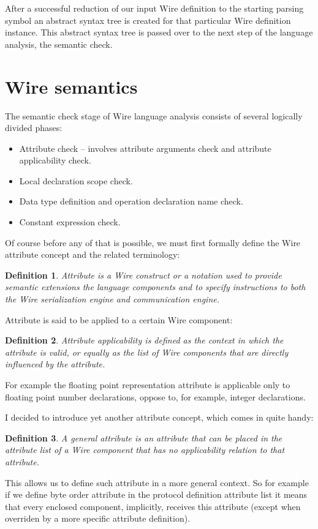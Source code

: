 \documentclass[times, utf8, diplomski]{fer}
\newtheorem{wiredef}{Definition}
\begin{document}
After a successful reduction of our input Wire definition to the starting parsing 
symbol an abstract syntax tree is created for that particular Wire definition 
instance. This abstract syntax tree is passed over to the next step of the 
language analysis, the semantic check.

\section{Wire semantics}
The semantic check stage of Wire language analysis consists of several logically divided phases:
\begin{itemize}
	\item Attribute check – involves attribute arguments check and attribute applicability check.
	\item Local declaration scope check.
	\item Data type definition and operation declaration name check.
	\item Constant expression check.
\end{itemize}

Of course before any of that is possible, we must first formally define the Wire 
attribute concept and the related terminology:
\begin{wiredef}
Attribute is a Wire construct or a notation used to provide semantic extensions 
the language components and to specify instructions to both the Wire serialization 
engine and communication engine.
\end{wiredef}

Attribute is said to be applied to a certain Wire component:
\begin{wiredef}
Attribute applicability is defined as the context in which the attribute is valid, 
or equally as the list of Wire components that are directly influenced by the attribute.
\end{wiredef}

For example the floating point representation attribute is applicable only to 
floating point number declarations, oppose to, for example, integer declarations.

I decided to introduce yet another attribute concept, which comes in quite handy:
\begin{wiredef}
A general attribute is an attribute that can be placed in the attribute list of 
a Wire component that has no applicability relation to that attribute.
\end{wiredef}

This allows us to define such attribute in a more general context. So for example 
if we define byte order attribute in the protocol definition attribute list it 
means that every enclosed component, implicitly, receives this attribute (except 
when overriden by a more specific attribute definition).
\end{document}
